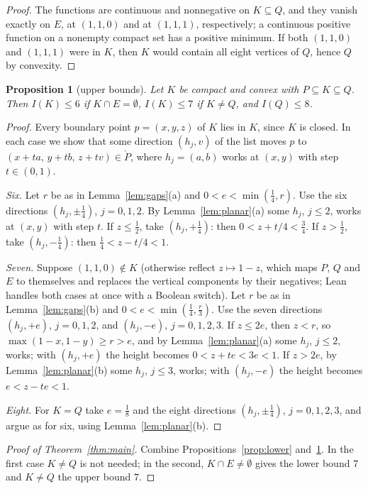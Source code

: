 \documentclass[11pt]{article}
\newtheorem{proposition}{Proposition}
\theoremstyle{definition}
\theoremstyle{remark}
\begin{document}
\begin{proof}
The functions are continuous and nonnegative on $K\subseteq Q$, and they vanish
exactly on $E$, at $(1,1,0)$ and at $(1,1,1)$, respectively; a continuous
positive function on a nonempty compact set has a positive minimum. If both
$(1,1,0)$ and $(1,1,1)$ were in $K$, then $K$ would contain all eight vertices
of $Q$, hence $Q$ by convexity.
\end{proof}

\begin{proposition}[upper bounds]\label{prop:upper}
Let $K$ be compact and convex with $P\subseteq K\subseteq Q$. Then $I(K)\le6$
if $K\cap E=\emptyset$, $I(K)\le7$ if $K\ne Q$, and $I(Q)\le8$.
\end{proposition}

\begin{proof}
Every boundary point $p=(x,y,z)$ of $K$ lies in $K$, since $K$ is closed. In
each case we show that some direction $(h_j,v)$ of the list moves $p$ to
$(x+ta,\,y+tb,\,z+tv)\in\mathring P$, where $h_j=(a,b)$ works at $(x,y)$ with
step $t\in(0,1)$.

\emph{Six.} Let $r$ be as in Lemma~\ref{lem:gaps}(a) and $0<e<\min(\tfrac14,r)$.
Use the six directions $(h_j,\pm\tfrac14)$, $j=0,1,2$. By
Lemma~\ref{lem:planar}(a) some $h_j$, $j\le2$, works at $(x,y)$ with step $t$.
If $z\le\tfrac12$, take $(h_j,+\tfrac14)$: then $0<z+t/4<\tfrac34$. If
$z>\tfrac12$, take $(h_j,-\tfrac14)$: then $\tfrac14<z-t/4<1$.

\emph{Seven.} Suppose $(1,1,0)\notin K$ (otherwise reflect $z\mapsto1-z$, which
maps $P$, $Q$ and $E$ to themselves and replaces the vertical components by
their negatives; Lean handles both cases at once with a Boolean switch). Let
$r$ be as in Lemma~\ref{lem:gaps}(b) and $0<e<\min(\tfrac14,\tfrac r3)$. Use
the seven directions $(h_j,+e)$, $j=0,1,2$, and $(h_j,-e)$, $j=0,1,2,3$. If
$z\le2e$, then $z<r$, so $\max(1-x,1-y)\ge r>e$, and by
Lemma~\ref{lem:planar}(a) some $h_j$, $j\le2$, works; with $(h_j,+e)$ the
height becomes $0<z+te<3e<1$. If $z>2e$, by Lemma~\ref{lem:planar}(b) some
$h_j$, $j\le3$, works; with $(h_j,-e)$ the height becomes $e<z-te<1$.

\emph{Eight.} For $K=Q$ take $e=\tfrac18$ and the eight directions
$(h_j,\pm\tfrac14)$, $j=0,1,2,3$, and argue as for six, using
Lemma~\ref{lem:planar}(b).
\end{proof}

\begin{proof}[Proof of Theorem~\ref{thm:main}]
Combine Propositions~\ref{prop:lower} and~\ref{prop:upper}. In the first case
$K\ne Q$ is not needed; in the second, $K\cap E\ne\emptyset$ gives the lower
bound $7$ and $K\ne Q$ the upper bound $7$.
\end{proof}
\end{document}
